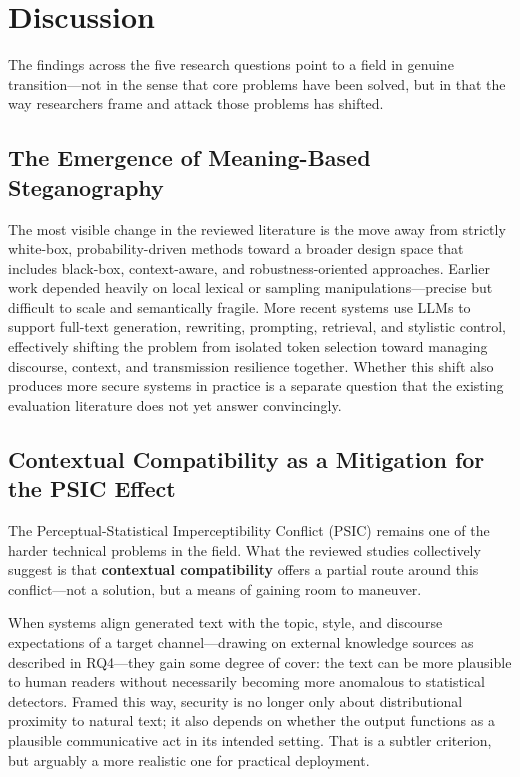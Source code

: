 \section{Discussion}
\label{sec:discussion}

The findings across the five research questions point to a field in genuine transition---not in the sense that core problems have been solved, but in that the way researchers frame and attack those problems has shifted.

\subsection{The Emergence of Meaning-Based Steganography}

The most visible change in the reviewed literature is the move away from strictly white-box, probability-driven methods toward a broader design space that includes black-box, context-aware, and robustness-oriented approaches. Earlier work depended heavily on local lexical or sampling manipulations---precise but difficult to scale and semantically fragile. More recent systems use LLMs to support full-text generation, rewriting, prompting, retrieval, and stylistic control, effectively shifting the problem from isolated token selection toward managing discourse, context, and transmission resilience together. Whether this shift also produces more secure systems in practice is a separate question that the existing evaluation literature does not yet answer convincingly.

\subsection{Contextual Compatibility as a Mitigation for the PSIC Effect}

The Perceptual-Statistical Imperceptibility Conflict (PSIC) remains one of the harder technical problems in the field. What the reviewed studies collectively suggest is that \textbf{contextual compatibility} offers a partial route around this conflict---not a solution, but a means of gaining room to maneuver.

When systems align generated text with the topic, style, and discourse expectations of a target channel---drawing on external knowledge sources as described in RQ4---they gain some degree of cover: the text can be more plausible to human readers without necessarily becoming more anomalous to statistical detectors. Framed this way, security is no longer only about distributional proximity to natural text; it also depends on whether the output functions as a plausible communicative act in its intended setting. That is a subtler criterion, but arguably a more realistic one for practical deployment.

